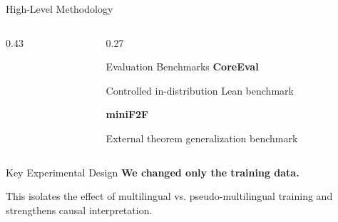 \documentclass[aspectratio=169]{beamer}
\begin{document}
\begin{frame}{High-Level Methodology}
\begin{columns}[T]
\begin{column}{0.43\textwidth}
\begin{tikzpicture}
\end{tikzpicture}

\end{column}

\begin{column}{0.27\textwidth}
\begin{block}{Evaluation Benchmarks}
\textbf{CoreEval}

Controlled in-distribution Lean benchmark

\vspace{0.35cm}

\textbf{miniF2F}

External theorem generalization benchmark
\end{block}
\end{column}

\end{columns}

\vspace{0.25cm}

\begin{alertblock}{Key Experimental Design}
\centering
\textbf{We changed only the training data.}

\vspace{0.12cm}

This isolates the effect of multilingual vs. pseudo-multilingual training and strengthens causal interpretation.
\end{alertblock}

\end{frame}
\end{document}
